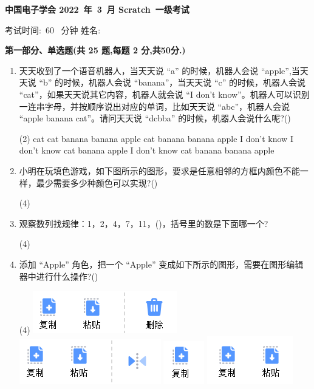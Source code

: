 \documentclass[10pt, a4paper]{article}
\newcommand{\Title}[3]{
    \begin{center}
        \Large \textbf{中国电子学会 #1~年~#2~月 Scratch~#3级考试}
    \end{center}
}
\newcommand{\TimeAndName}[1]{
    \begin{center}
        考试时间:~#1~ 分钟 \qquad\qquad\qquad\qquad 姓名:\underline{\quad\quad\quad\quad}
    \end{center}
}
\begin{document}
    \Title{2022}{3}{一} %
    \TimeAndName{60} %

    \vspace{2mm}
    {\noindent\textbf{第一部分、单选题(共 25 题,每题 2 分,共50分.)}}
    \begin{enumerate}
        \item 天天收到了一个语音机器人，当天天说 “a” 的时候，机器人会说 “apple”,当天天说 “b” 的时候，机器人会说 “banana”，当天天说 “c” 的时候，机器人会说 “cat”，如果天天说其它内容，机器人就会说 “I don't know”。机器人可以识别一连串字母，并按顺序说出对应的单词，比如天天说 “abc”，机器人会说 “apple banana cat”。请问天天说 “dcbba” 的时候，机器人会说什么呢?(\qquad)
        \begin{tasks}(2)
            \task cat cat banana banana apple
            \task cat banana banana apple I don't know
            \task I don't know cat banana apple
            \task I don't know cat banana banana apple
        \end{tasks}

        \item 小明在玩填色游戏，如下图所示的图形，要求是任意相邻的方框内颜色不能一样，最少需要多少种颜色可以实现?(\qquad)
        \begin{tasks}(4)
        \end{tasks}

        \item 观察数列找规律：1，2，4，7，11，(\qquad)，括号里的数是下面哪一个?
        \begin{tasks}(4)
        \end{tasks}

        \item 添加 “Apple” 角色，把一个 “Apple” 变成如下所示的图形，需要在图形编辑器中进行什么操作?(\qquad)
        \begin{tasks}(4)
            \task \includegraphics[width=.15\textwidth]{4a.png}
            \task \includegraphics[width=.15\textwidth]{4b.png}
            \task \includegraphics[width=.05\textwidth]{4c.png}
            \task \includegraphics[width=.1\textwidth]{4d.png}
        \end{tasks}


\end{enumerate}
\end{document}

